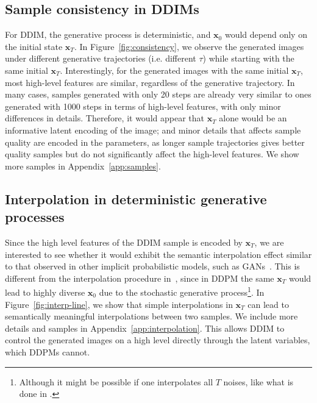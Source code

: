 \subsection{Sample consistency in DDIMs} For DDIM, the generative process is deterministic, and ${\bm{x}}_0$ would depend only on the initial state ${\bm{x}}_T$. In Figure~\ref{fig:consistency}, we observe the generated images under different generative trajectories (i.e. different $\tau$) while starting with the same initial ${\bm{x}}_T$. Interestingly, for the generated images with the same initial ${\bm{x}}_T$, most high-level features are similar, regardless of the generative trajectory. In many cases, samples generated with only 20 steps are already very similar to ones generated with 1000 steps in terms of high-level features, with only minor differences in details. Therefore, it would appear that ${\bm{x}}_T$ alone would be an informative latent encoding of the image; and minor details that affects sample quality are encoded in the parameters, as longer sample trajectories gives better quality samples but do not significantly affect the high-level features. We show more samples in Appendix~\ref{app:samples}. 

\subsection{Interpolation in deterministic generative processes} 

Since the high level features of the DDIM sample is encoded by ${\bm{x}}_T$, we are interested to see whether it would exhibit the semantic interpolation effect similar to that observed in other implicit probabilistic models, such as GANs~\citep{goodfellow2014generative}. This is different from the interpolation procedure in~\citet{ho2020denoising}, since in DDPM the same ${\bm{x}}_T$ would lead to highly diverse ${\bm{x}}_0$ due to the stochastic generative process\footnote{Although it might be possible if one interpolates all $T$ noises, like what is done in \citet{song2020improved}.}. In Figure~\ref{fig:interp-line}, we show that simple interpolations in ${\bm{x}}_T$ can lead to semantically meaningful interpolations between two samples. We include more details and samples in Appendix~\ref{app:interpolation}. This allows DDIM to control the generated images on a high level directly through the latent variables, which DDPMs cannot.

